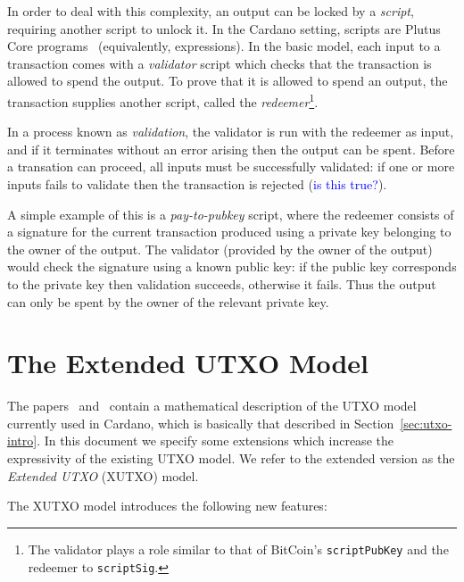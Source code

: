 \documentclass[a4paper]{article}
\newcommand{\blue}[1]{\textcolor{blue}{#1}}
\renewcommand{\i}{\textit}  %
\theoremstyle{definition}  %
\begin{document}
In order to deal with this complexity, an output can be locked by a
\textit{script}, requiring another script to unlock it.  In the
Cardano setting, scripts are Plutus Core
programs~\cite{Plutus-Core-spec} (equivalently, expressions).  In the
basic model, each input to a transaction comes with a \i{validator}
script which checks that the transaction is allowed to spend the
output. To prove that it is allowed to spend an output, the
transaction supplies another script, called the \i{redeemer}\footnote{
  The validator plays a role similar to that of BitCoin's
  \texttt{scriptPubKey} and the redeemer to \texttt{scriptSig}.}.

In a process known as \i{validation}, the validator is run with the
redeemer as input, and if it terminates without an error arising then
the output can be spent.  Before a transation can proceed, all inputs
must be successfully validated: if one or more inputs fails to validate
then the transaction is rejected (\blue{is this true?}).

A simple example of this is a \i{pay-to-pubkey} script, where the
redeemer consists of a signature for the current transaction produced
using a private key belonging to the owner of the output.  The
validator (provided by the owner of the output) would check the
signature using a known public key: if the public key corresponds to
the private key then validation succeeds, otherwise it fails.  Thus
the output can only be spent by the owner of the relevant private key.

\section{The Extended UTXO Model}
\label{sec:xutxo}
The papers~\cite{Zahnentferner18-UTxO}
and~\cite{Zahnentferner18-Chimeric} contain a mathematical description
of the UTXO model currently used in Cardano, which is basically that
described in Section~\ref{sec:utxo-intro}.  In this document we specify
some extensions which increase the expressivity of the existing UTXO
model.  We refer to the extended version as the \textit{Extended UTXO}
(XUTXO) model.  


The XUTXO model introduces the following new features:
\end{document}
